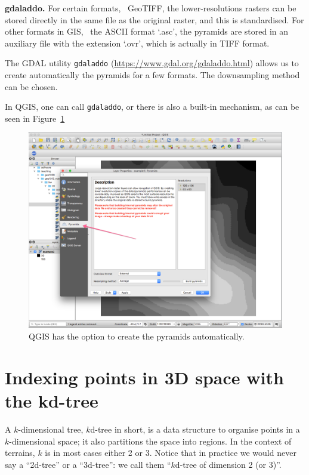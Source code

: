 \begin{myfloat}
  \begin{practice-box}
    \textbf{gdaladdo.} 
    For certain formats, \eg\ GeoTIFF, the lower-resolutions rasters can be stored directly in the same file as the original raster, and this is standardised.
    For other formats in GIS, \eg\ the ASCII format `.asc', the pyramids are stored in an auxiliary file with the extension `.ovr', which is actually in TIFF format.

    The GDAL utility \texttt{gdaladdo} (\url{https://www.gdal.org/gdaladdo.html}) allows us to create automatically the pyramids for a few formats.
    The downsampling method can be chosen.

    In QGIS, one can call \texttt{gdaladdo}, or there is also a built-in mechanism, as can be seen in Figure~\ref{fig:qgis}
  \end{practice-box}
\end{myfloat}

\begin{figure}
  \centering
  \includegraphics[width=0.8\linewidth]{figs/qgis}
  \caption{QGIS has the option to create the pyramids automatically.}
\label{fig:qgis}
\end{figure}



%
\section{Indexing points in 3D space with the kd-tree}
\label{sec:kdtree}

A $k$-dimensional tree, $k$d-tree in short, is a data structure to organise points in a $k$-dimensional space; it also partitions the space into regions.
In the context of terrains, $k$ is in most cases either 2 or 3.
Notice that in practice we would never say a ``2d-tree'' or a ``3d-tree'': we call them ``$k$d-tree of dimension 2 (or 3)''.

